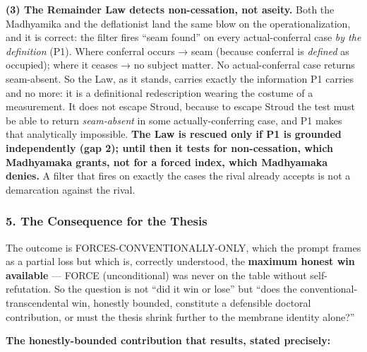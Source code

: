 \documentclass[11pt]{article}
\begin{document}
\textbf{(3) The Remainder Law detects non-cessation, not aseity.} Both the Madhyamika and the deflationist land the same blow on the operationalization, and it is correct: the filter fires ``seam found'' on every actual-conferral case \emph{by the definition} (P1). Where conferral occurs → seam (because conferral is \emph{defined} as occupied); where it ceases → no subject matter. No actual-conferral case returns seam-absent. So the Law, as it stands, carries exactly the information P1 carries and no more: it is a definitional redescription wearing the costume of a measurement. It does not escape Stroud, because to escape Stroud the test must be able to return \emph{seam-absent} in some actually-conferring case, and P1 makes that analytically impossible. \textbf{The Law is rescued only if P1 is grounded independently (gap 2); until then it tests for non-cessation, which Madhyamaka grants, not for a forced index, which Madhyamaka denies.} A filter that fires on exactly the cases the rival already accepts is not a demarcation against the rival.

\subsubsection*{5. The Consequence for the Thesis}

The outcome is FORCES-CONVENTIONALLY-ONLY, which the prompt frames as a partial loss but which is, correctly understood, the \textbf{maximum honest win available} — FORCE (unconditional) was never on the table without self-refutation. So the question is not ``did it win or lose'' but ``does the conventional-transcendental win, honestly bounded, constitute a defensible doctoral contribution, or must the thesis shrink further to the membrane identity alone?''

\textbf{The honestly-bounded contribution that results, stated precisely:}
\end{document}
